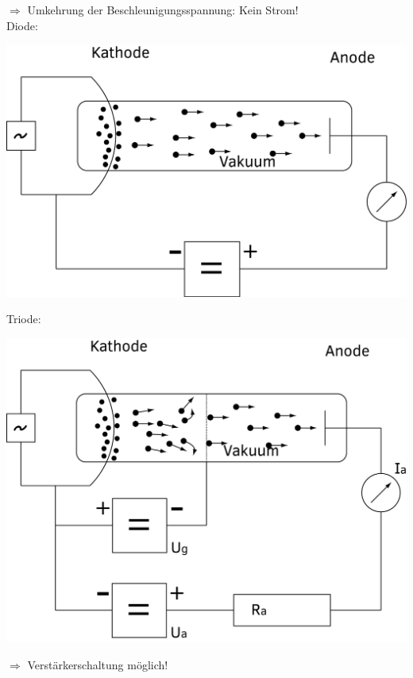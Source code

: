 \documentclass[11pt]{article}
\begin{document}
	$ \Rightarrow $ Umkehrung der Beschleunigungsspannung: Kein Strom! \\
	\newpage
	Diode:\\
	\begin{center}
		\includegraphics[width=0.7\linewidth]{skizzen/15/VL07/1}
	\end{center}
	\indent Triode: \\
	\begin{center}
		\includegraphics[width=0.7\linewidth]{skizzen/15/VL07/2}
	\end{center}
	\indent $ \Rightarrow $ Verstärkerschaltung möglich!\\
\end{document}
